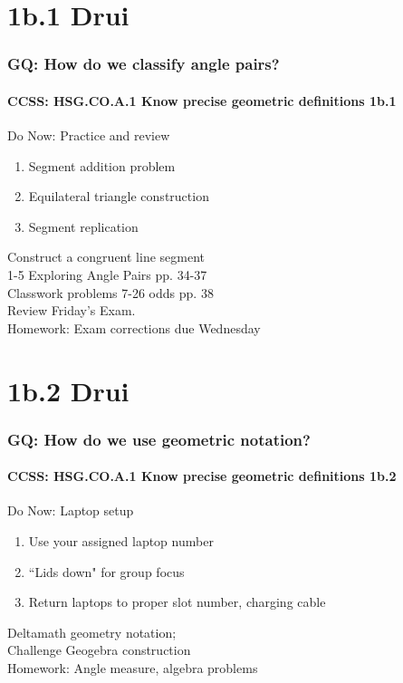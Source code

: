 \documentclass{beamer}
\begin{document}
  \section{1b.1 Drui}
    \frame
    {
      \frametitle{GQ: How do we classify angle pairs?}
      \framesubtitle{CCSS: HSG.CO.A.1 Know precise geometric definitions  \alert{1b.1}}

      \begin{block}{Do Now: Practice and review}
      \begin{enumerate}
          \item Segment addition problem
          \item Equilateral triangle construction
          \item Segment replication
      \end{enumerate}
      \end{block}
      Construct a congruent line segment \\
      1-5 Exploring Angle Pairs pp. 34-37\\
      Classwork problems 7-26 odds pp. 38\\
      Review Friday's Exam.\\
      \vspace{0.5cm}
      Homework: Exam corrections due Wednesday\\

    }


\section{1b.2 Drui} %
  \frame
  {
    \frametitle{GQ: How do we use geometric notation?}
    \framesubtitle{CCSS: HSG.CO.A.1 Know precise geometric definitions  \alert{1b.2}}

    \begin{block}{Do Now: Laptop setup}
    \begin{enumerate}
        \item Use your assigned laptop number
        \item ``Lids down" for group focus
        \item Return laptops to proper slot number, charging cable
    \end{enumerate}
    \end{block}
    Deltamath geometry notation; \\Challenge Geogebra construction\\
    \vspace{1cm}
    Homework: Angle measure, algebra problems
  }
\end{document}
